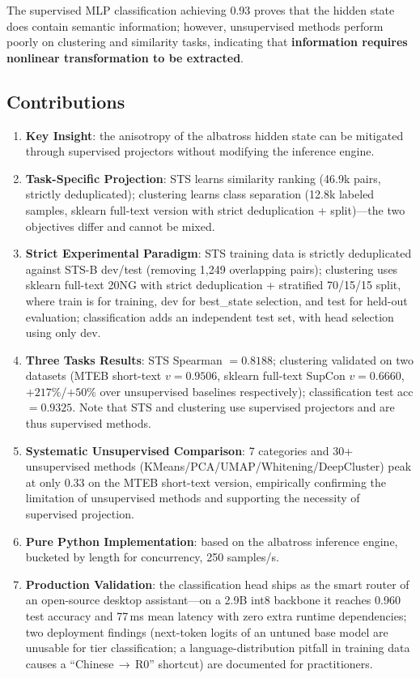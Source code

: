 \documentclass[11pt]{article}
\begin{document}
The supervised MLP classification achieving 0.93 proves that the hidden state
does contain semantic information; however, unsupervised methods perform
poorly on clustering and similarity tasks, indicating that \textbf{information
requires nonlinear transformation to be extracted}.

\subsection{Contributions}

\begin{enumerate}
  \item \textbf{Key Insight}: the anisotropy of the albatross hidden state
  can be mitigated through supervised projectors without modifying the
  inference engine.
  \item \textbf{Task-Specific Projection}: STS learns similarity ranking
  (46.9k pairs, strictly deduplicated); clustering learns class separation
  (12.8k labeled samples, sklearn full-text version with strict
  deduplication + split)---the two objectives differ and cannot be mixed.
  \item \textbf{Strict Experimental Paradigm}: STS training data is strictly
  deduplicated against STS-B dev/test (removing 1,249 overlapping pairs);
  clustering uses sklearn full-text 20NG with strict deduplication +
  stratified 70/15/15 split, where train is for training, dev for
  best\_state selection, and test for held-out evaluation; classification
  adds an independent test set, with head selection using only dev.
  \item \textbf{Three Tasks Results}: STS Spearman $=0.8188$; clustering
  validated on two datasets (MTEB short-text $v=0.9506$, sklearn full-text
  SupCon $v=0.6660$, $+217\%$/$+50\%$ over unsupervised baselines
  respectively); classification test acc $=0.9325$. Note that STS and
  clustering use supervised projectors and are thus supervised methods.
  \item \textbf{Systematic Unsupervised Comparison}: 7 categories and 30+
  unsupervised methods (KMeans/PCA/UMAP/Whitening/DeepCluster) peak at only
  0.33 on the MTEB short-text version, empirically confirming the limitation
  of unsupervised methods and supporting the necessity of supervised
  projection.
  \item \textbf{Pure Python Implementation}: based on the albatross inference
  engine, bucketed by length for concurrency, 250 samples/s.
  \item \textbf{Production Validation}: the classification head ships as the
  smart router of an open-source desktop assistant---on a 2.9B int8 backbone
  it reaches 0.960 test accuracy and 77\,ms mean latency with zero extra
  runtime dependencies; two deployment findings (next-token logits of an
  untuned base model are unusable for tier classification; a
  language-distribution pitfall in training data causes a
  ``Chinese\,$\to$\,R0'' shortcut) are documented for practitioners.
\end{enumerate}
\end{document}
